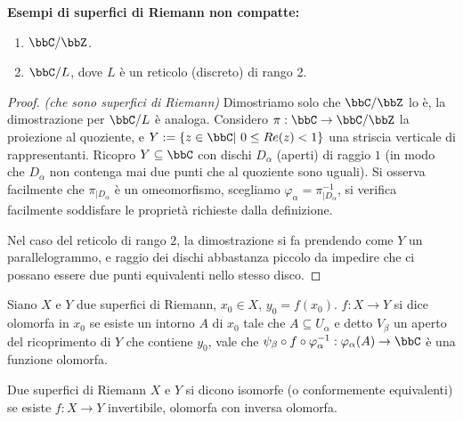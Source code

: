 \textbf{Esempi di superfici di Riemann non compatte:}
\begin{enumerate} %
  \item $\bbC/\bbZ$.
  \item $\bbC/L$, dove $L$ è un reticolo (discreto) di rango 2.
\end{enumerate}
\begin{proof} \textit{(che sono superfici di Riemann)}
    Dimostriamo solo che $\bbC/\bbZ$ lo è, la dimostrazione per $\bbC/L$ è analoga. Considero $\pi:\bbC\rightarrow\bbC/\bbZ$ la proiezione al quoziente, e $Y:=\{z\in\bbC|\ 0\leq Re(z)<1\}$ una striscia verticale di rappresentanti. Ricopro $Y\subseteq\bbC$ con dischi $D_\alpha$ (aperti) di raggio $1$ (in modo che $D_\alpha$ non contenga mai due punti che al quoziente sono uguali). Si osserva facilmente che $\pi_{|D_\alpha}$ è un omeomorfismo, scegliamo $\varphi_\alpha=\pi_{|D_\alpha}^{-1}$, si verifica facilmente soddisfare le proprietà richieste dalla definizione.

    Nel caso del reticolo di rango $2$, la dimostrazione si fa prendendo come $Y$ un parallelogrammo, e raggio dei dischi abbastanza piccolo da impedire che ci possano essere due punti equivalenti nello stesso disco.
\end{proof}

\begin{definizione}
Siano $X$ e $Y$ due superfici di Riemann, $x_0\in X$, $y_0=f(x_0)$. $f:X\rightarrow Y$ si dice olomorfa in $x_0$ se esiste un intorno $A$ di $x_0$ tale che $A\subseteq U_\alpha$ e detto $V_\beta$ un aperto del ricoprimento di $Y$ che contiene $y_0$, vale che $\psi_\beta \circ f \circ \varphi_\alpha^{-1}: \varphi_\alpha(A)\rightarrow \bbC$ è una funzione olomorfa.
\end{definizione}


\begin{definizione}
Due superfici di Riemann $X$ e $Y$ si dicono isomorfe (o conformemente equivalenti) se esiste $f:X\rightarrow Y$ invertibile, olomorfa con inversa olomorfa.
\end{definizione}


